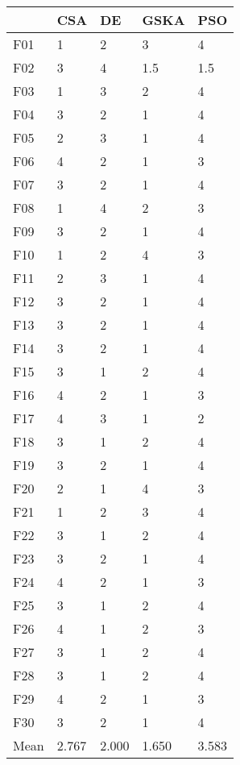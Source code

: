 \begin{tabular}{lllll}
\toprule
{} &    CSA &     DE &   GSKA &    PSO \\
\midrule
F01  &      1 &      2 &      3 &      4 \\
F02  &      3 &      4 &    1.5 &    1.5 \\
F03  &      1 &      3 &      2 &      4 \\
F04  &      3 &      2 &      1 &      4 \\
F05  &      2 &      3 &      1 &      4 \\
F06  &      4 &      2 &      1 &      3 \\
F07  &      3 &      2 &      1 &      4 \\
F08  &      1 &      4 &      2 &      3 \\
F09  &      3 &      2 &      1 &      4 \\
F10  &      1 &      2 &      4 &      3 \\
F11  &      2 &      3 &      1 &      4 \\
F12  &      3 &      2 &      1 &      4 \\
F13  &      3 &      2 &      1 &      4 \\
F14  &      3 &      2 &      1 &      4 \\
F15  &      3 &      1 &      2 &      4 \\
F16  &      4 &      2 &      1 &      3 \\
F17  &      4 &      3 &      1 &      2 \\
F18  &      3 &      1 &      2 &      4 \\
F19  &      3 &      2 &      1 &      4 \\
F20  &      2 &      1 &      4 &      3 \\
F21  &      1 &      2 &      3 &      4 \\
F22  &      3 &      1 &      2 &      4 \\
F23  &      3 &      2 &      1 &      4 \\
F24  &      4 &      2 &      1 &      3 \\
F25  &      3 &      1 &      2 &      4 \\
F26  &      4 &      1 &      2 &      3 \\
F27  &      3 &      1 &      2 &      4 \\
F28  &      3 &      1 &      2 &      4 \\
F29  &      4 &      2 &      1 &      3 \\
F30  &      3 &      2 &      1 &      4 \\
Mean &  2.767 &  2.000 &  1.650 &  3.583 \\
\bottomrule
\end{tabular}
